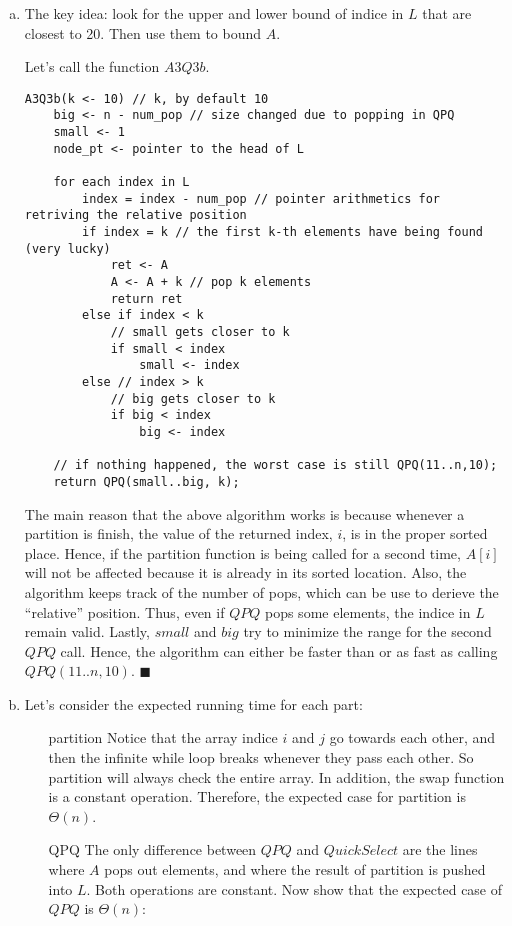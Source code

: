 \documentclass[12pt]{article}
\begin{document}
\begin{enumerate}[(a)]
\item
The key idea: look for the upper and lower bound of indice in $L$ that are closest to 20. Then use them to bound $A$.

Let's call the function $A3Q3b$.
\begin{lstlisting}
A3Q3b(k <- 10) // k, by default 10
	big <- n - num_pop // size changed due to popping in QPQ
	small <- 1
	node_pt <- pointer to the head of L

	for each index in L
		index = index - num_pop // pointer arithmetics for retriving the relative position
		if index = k // the first k-th elements have being found (very lucky)
			ret <- A
			A <- A + k // pop k elements
			return ret
		else if index < k
			// small gets closer to k
			if small < index
				small <- index
		else // index > k
			// big gets closer to k
			if big < index
				big <- index

	// if nothing happened, the worst case is still QPQ(11..n,10);
	return QPQ(small..big, k);
\end{lstlisting}
The main reason that the above algorithm works is because whenever a partition is finish, the value of the returned index, $i$, is in the proper sorted place.
Hence, if the partition function is being called for a second time, $A[i]$ will not be affected because it is already in its sorted location. 
Also, the algorithm keeps track of the number of pops, which can be use to derieve the ``relative'' position.
Thus, even if $QPQ$ pops some elements, the indice in $L$ remain valid.
Lastly, $small$ and $big$ try to minimize the range for the second $QPQ$ call.
Hence, the algorithm can either be faster than or as fast as calling $QPQ(11..n,10)$.
\hfill $\blacksquare$

\item
Let's consider the expected running time for each part:
\begin{itemize}
\item[partition]
Notice that the array indice $i$ and $j$ go towards each other, and then the infinite while loop breaks whenever they pass each other.
So partition will always check the entire array.
In addition, the swap function is a constant operation. Therefore, the expected case for partition is $\Theta(n)$.
\item[QPQ]
The only difference between $QPQ$ and $QuickSelect$ are the lines where $A$ pops out elements, and where the result of partition is pushed into $L$.
Both operations are constant.
Now show that the expected case of $QPQ$ is $\Theta(n)$:


\end{itemize}
\end{enumerate}
\end{document}
